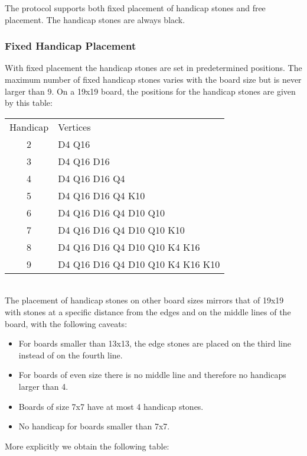 \documentclass[a4paper]{article}
\begin{document}
The protocol supports both fixed placement of handicap stones and free
placement. The handicap stones are always black.

\subsubsection{Fixed Handicap Placement}
\label{sec:fixed-handicap-placement}

With fixed placement the handicap stones are set in predetermined
positions. The maximum number of fixed handicap stones varies with the
board size but is never larger than 9. On a 19x19 board, the positions
for the handicap stones are given by this table:

\begin{tabular}{cl}
Handicap & Vertices \\
2 & D4 Q16 \\
3 & D4 Q16 D16 \\
4 & D4 Q16 D16 Q4 \\
5 & D4 Q16 D16 Q4 K10 \\
6 & D4 Q16 D16 Q4 D10 Q10 \\
7 & D4 Q16 D16 Q4 D10 Q10 K10 \\
8 & D4 Q16 D16 Q4 D10 Q10 K4 K16 \\
9 & D4 Q16 D16 Q4 D10 Q10 K4 K16 K10 \\
\end{tabular} \\

The placement of handicap stones on other board sizes mirrors that of
19x19 with stones at a specific distance from the edges and on the
middle lines of the board, with the following caveats:

\begin{itemize}
\item For boards smaller than 13x13, the edge stones are placed on the third
  line instead of on the fourth line.
\item For boards of even size there is no middle line and therefore no
  handicaps larger than 4.
\item Boards of size 7x7 have at most 4 handicap stones.
\item No handicap for boards smaller than 7x7.
\end{itemize}

More explicitly we obtain the following table:
\end{document}
